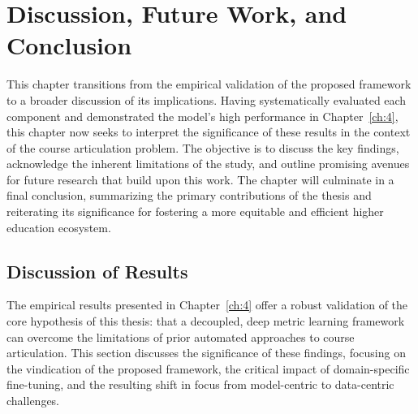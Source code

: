 \chapter{Discussion, Future Work, and Conclusion}
This chapter transitions from the empirical validation of the proposed framework to a broader discussion of its implications. Having systematically evaluated each component and demonstrated the model's high performance in Chapter~\ref{ch:4}, this chapter now seeks to interpret the significance of these results in the context of the course articulation problem. The objective is to discuss the key findings, acknowledge the inherent limitations of the study, and outline promising avenues for future research that build upon this work. The chapter will culminate in a final conclusion, summarizing the primary contributions of the thesis and reiterating its significance for fostering a more equitable and efficient higher education ecosystem.

\section{Discussion of Results}\label{ch:5.1}
The empirical results presented in Chapter~\ref{ch:4} offer a robust validation of the core hypothesis of this thesis: that a decoupled, deep metric learning framework can overcome the limitations of prior automated approaches to course articulation. This section discusses the significance of these findings, focusing on the vindication of the proposed framework, the critical impact of domain-specific fine-tuning, and the resulting shift in focus from model-centric to data-centric challenges.

